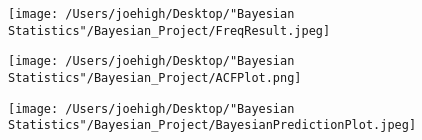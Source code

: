 \documentclass[10pt,a4paper]{article}
\begin{document}
\begin{figure}[H]
\begin{center}
\texttt{[image: /Users/joehigh/Desktop/"Bayesian Statistics"/Bayesian\_Project/FreqResult.jpeg]}
\caption{}
\label{fig}
\end{center}
\end{figure}

\begin{figure}[H]
\begin{center}
\texttt{[image: /Users/joehigh/Desktop/"Bayesian Statistics"/Bayesian\_Project/ACFPlot.png]}
\caption{}
\label{fig}
\end{center}
\end{figure}

\begin{figure}[H]
\begin{center}
\texttt{[image: /Users/joehigh/Desktop/"Bayesian Statistics"/Bayesian\_Project/BayesianPredictionPlot.jpeg]}
\caption{}
\label{fig1}
\end{center}
\end{figure}
\end{document}
